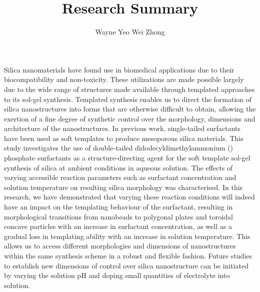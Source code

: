 \documentclass[a4paper,12pt]{article}
\date{}
\author{Wayne Yeo Wei Zhong} %
\title{Research Summary} %
\begin{document}
	\maketitle

	Silica nanomaterials have found use in biomedical applications due to their biocompatibility and non-toxicity. These utilizations are made possible largely due to the wide range of structures made available through templated approaches to its sol-gel synthesis. Templated synthesis enables us to direct the formation of silica nanostructures into forms that are otherwise difficult to obtain, allowing the exertion of a fine degree of synthetic control over the morphology, dimensions and architecture of the nanostructures. In previous work, single-tailed surfactants have been used as soft templates to produce mesoporous silica materials. This study investigates the use of double-tailed didodecyldimethylammonium () phosphate surfactants as a structure-directing agent for the soft template sol-gel synthesis of silica at ambient conditions in aqueous solution. The effects of varying accessible reaction parameters such as surfactant concentration and solution temperature on resulting silica morphology was characterised. In this research, we have demonstrated that varying these reaction conditions will indeed have an impact on the templating behaviour of the surfactant, resulting in morphological transitions from nanobeads to polygonal plates and toroidal concave particles with an increase in surfactant concentration, as well as a gradual loss in templating ability with an increase in solution temperature. This allows us to access different morphologies and dimensions of nanostructures within the same synthesis scheme in a robust and flexible fashion. Future studies to establish new dimensions of control over silica nanostructure can be initiated by varying the solution pH and doping small quantities of electrolyte into solution.
	
	 
	
\end{document}
